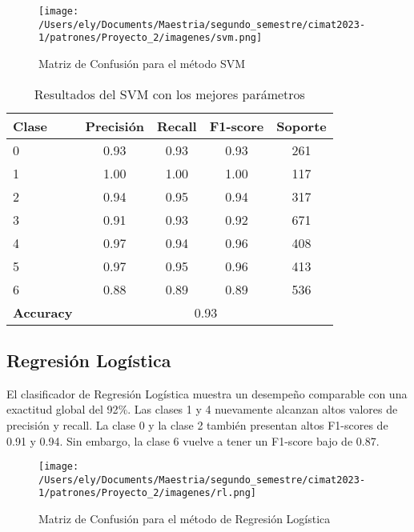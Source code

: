 \documentclass[letterpaper,spanish,reprint,nofootinbib,showkeys,aps]{revtex4-2}
\begin{document}
\begin{figure} [H]
	\begin{center}
		\texttt{[image: /Users/ely/Documents/Maestria/segundo\_semestre/cimat2023-1/patrones/Proyecto\_2/imagenes/svm.png]}
		\caption{Matriz de Confusión para el método SVM}
		\label{svm} 
   \end{center} 
\end{figure}


\begin{table}[ht]
	\centering
	\begin{tabular}{lcccc}
	\hline
	\textbf{Clase} & \textbf{Precisión} & \textbf{Recall} & \textbf{F1-score} & \textbf{Soporte} \\
	\hline
	0 & 0.93 & 0.93 & 0.93 & 261 \\
	1 & 1.00 & 1.00 & 1.00 & 117 \\
	2 & 0.94 & 0.95 & 0.94 & 317 \\
	3 & 0.91 & 0.93 & 0.92 & 671 \\
	4 & 0.97 & 0.94 & 0.96 & 408 \\
	5 & 0.97 & 0.95 & 0.96 & 413 \\
	6 & 0.88 & 0.89 & 0.89 & 536 \\
	\hline
	\textbf{Accuracy} & \multicolumn{4}{c}{0.93} \\
	\hline
	\end{tabular}
	\caption{Resultados del SVM con los mejores parámetros}
	\label{tab:svm_results}
	\end{table}

\subsection*{Regresión Logística}


El clasificador de Regresión Logística muestra un desempeño comparable con una exactitud global del 92$\%$. Las clases 1 y 4  nuevamente alcanzan altos valores de precisión y recall. La clase 0 y la clase 2 también presentan altos F1-scores de 0.91 y 0.94. Sin embargo, la clase 6 vuelve a tener un F1-score bajo de 0.87.


\begin{figure} [H]
	\begin{center}
		\texttt{[image: /Users/ely/Documents/Maestria/segundo\_semestre/cimat2023-1/patrones/Proyecto\_2/imagenes/rl.png]}
		\caption{Matriz de Confusión para el método de Regresión Logística}
		\label{rl} 
   \end{center} 
\end{figure}
\end{document}

